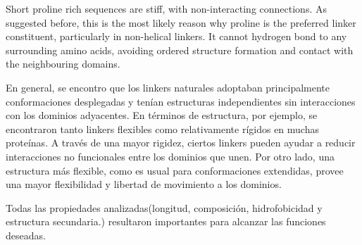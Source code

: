Short proline rich sequences are
stiff, with non-interacting connections. As suggested before,
this is the most likely reason why proline is the preferred
linker constituent, particularly in non-helical linkers. It cannot
hydrogen bond to any surrounding amino acids, avoiding
ordered structure formation and contact with the neighbouring
domains.







En general, se encontro que los linkers naturales adoptaban principalmente conformaciones desplegadas y tenían estructuras independientes sin interacciones con los dominios adyacentes.
En términos de estructura, por ejemplo, se encontraron tanto linkers flexibles como relativamente rígidos en muchas proteínas.
A través de una mayor rigidez, ciertos linkers pueden ayudar a reducir interacciones no funcionales entre los dominios que unen. 
Por otro lado, una estructura más flexible, como es usual para conformaciones extendidas, provee una mayor flexibilidad y libertad de movimiento a los dominios.






Todas las propiedades analizadas(longitud, composición, hidrofobicidad y estructura secundaria.) resultaron importantes para alcanzar las funciones deseadas.



